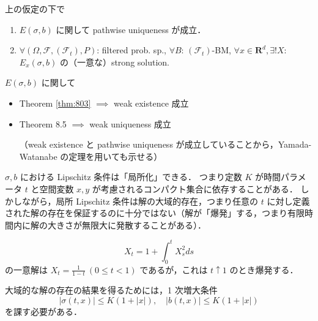 \documentclass{jsarticle}
\begin{document}
\bigskip

\setcounter{thm}{2}

\begin{screen}
    \begin{thm}\label{thm:803}
        上の仮定の下で
        \begin{enumerate}[label=(\roman*)]
            \item
            $E(\sigma, b)$ に関して pathwise uniqueness が成立．
            \item
            $\forall (\Omega, \mathcal{F}, (\mathcal{F}_t), P)$: filtered prob. sp., $\forall B$: $(\mathcal{F}_t)$-BM, $\forall x\in\mathbf{R}^d, \exists! X$: $E_x(\sigma, b)$ の（一意な）strong solution.
        \end{enumerate}
    \end{thm}
\end{screen}

$E(\sigma, b)$ に関して 
\begin{itemize}
    \item 
    Theorem \ref{thm:803}
    $\implies $ weak existence 成立
    \item
    Theorem 8.5
    $\implies $ weak uniqueness 成立
    
    （weak existence と pathwise uniqueness が成立していることから，Yamada-Watanabe の定理を用いても示せる）
\end{itemize}

\begin{remark*}
    $\sigma, b$ における Lipschitz 条件は「局所化」できる．
    つまり定数 $K$ が時間パラメータ $t$ と空間変数 $x, y$ が考慮されるコンパクト集合に依存することがある．
    しかしながら，局所 Lipschitz 条件は解の大域的存在，つまり任意の $t$ に対し定義された解の存在を保証するのに十分ではない（解が「爆発」する，つまり有限時間内に解の大きさが無限大に発散することがある）．

    \begin{ex*}
        $$
        X_t
        = 1+\int_0^t X_s^2 ds
        $$
        の一意解は $X_t=\frac{1}{1-t}\ (0\le t<1)$ であるが，これは $t\uparrow1$ のとき爆発する．
    \end{ex*}
    
    大域的な解の存在の結果を得るためには，1 次増大条件
    $$
    \left\lvert \sigma(t, x)\right\rvert\le K(1+\left\lvert x\right\rvert), \quad
    \left\lvert b(t, x)\right\rvert\le K(1+\left\lvert x\right\rvert)
    $$
    を課す必要がある．
\end{remark*}
\end{document}
